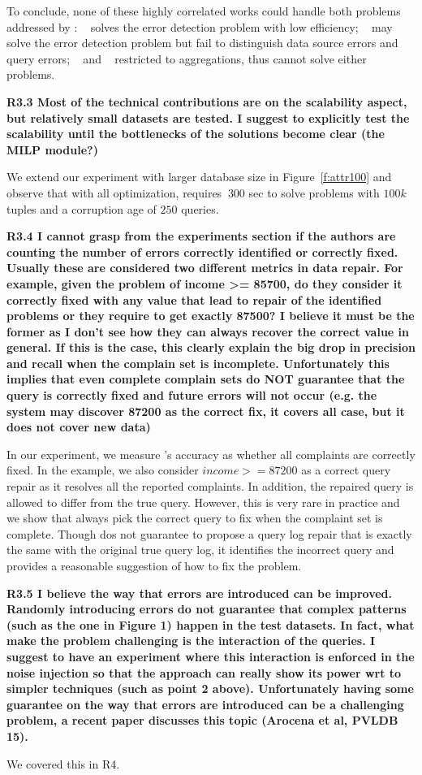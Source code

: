 To conclude, none of these highly correlated works could handle both problems addressed by \sys: ~\cite{meliou2011tracing} solves the error detection problem with low efficiency; ~\cite{chalamalla2014} may solve the error detection problem but fail to distinguish data source errors and query errors; ~\cite{Wu13} and ~\cite{roy2014formal} restricted to aggregations, thus cannot solve either problems.

\noindent \textbf{R3.3 Most of the technical contributions are on the scalability aspect, but relatively small datasets are tested. I suggest to explicitly test the scalability until the bottlenecks of the solutions become clear (the MILP module?)}

We extend our experiment with larger database size in Figure~\ref{f:attr100} and observe that with all optimization, \sys requires $~300$ sec to solve problems with $100k$ tuples and a corruption age of $250$ queries. 

\noindent \textbf{R3.4 I cannot grasp from the experiments section if the authors are counting the number of errors correctly identified or correctly fixed. Usually these are considered two different metrics in data repair. For example, given the problem of income >= 85700, do they consider it correctly fixed with any value that lead to repair of the identified problems or they require to get exactly 87500? 
I believe it must be the former as I don't see how they can always recover the correct value in general. If this is the case, this clearly explain the big drop in precision and recall when the complain set is incomplete. Unfortunately this implies that even complete complain sets do NOT guarantee that the query is correctly fixed and future errors will not occur (e.g. the system may discover 87200 as the correct fix, it covers all case, but it does not cover new data)}

In our experiment, we measure \sys's accuracy as whether all complaints are correctly fixed. In the example, we also consider $income >= 87200$ as a correct query repair as it resolves all the reported complaints. In addition, the repaired query is allowed to differ from the true query. However, this is very rare in practice and we show that \sys always pick the correct query to fix when the complaint set is complete. Though \sys dos not guarantee to propose a query log repair that is exactly the same with the original true query log, it identifies the incorrect query and provides a reasonable suggestion of how to fix the problem. 

\noindent \textbf{R3.5 I believe the way that errors are introduced can be improved. Randomly introducing errors do not guarantee that complex patterns (such as the one in Figure 1) happen in the test datasets. In fact, what make the problem challenging is the interaction of the queries. I suggest to have an experiment where this interaction is enforced in the noise injection so that the approach can really show its power wrt to simpler techniques (such as point 2 above). 
Unfortunately having some guarantee on the way that errors are introduced can be a challenging problem, a recent paper discusses this topic (Arocena et al, PVLDB 15).}

We covered this in R4. 


\pagebreak